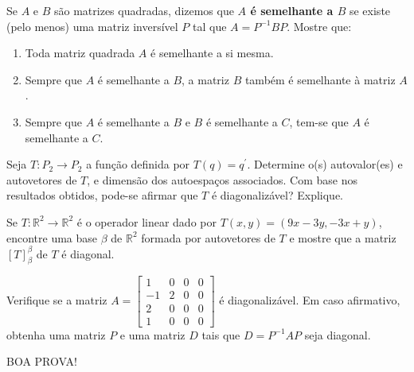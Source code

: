 \documentclass[12pt,a4paper]{article}
\newcommand{\fixme}{{\color{red}(...)}}
\newcommand*\R{\mathbb{R}}
\begin{document}
\begin{ExerciseList}
\Exercise[title={2,5}]
Se $A$ e $B$ são matrizes quadradas, dizemos que \textbf{$A$ é semelhante a $B$} se existe (pelo menos) uma matriz inversível $P$ tal que $A = P^{-1} B P$. Mostre que:
\begin{enumerate}
\item Toda matriz quadrada $A$ é semelhante a si mesma.
\item Sempre que $A$ é semelhante a $B$, a matriz $B$ também é semelhante à matriz $A$.
\item Sempre que $A$ é semelhante a $B$ e $B$ é semelhante a $C$, tem-se que $A$ é semelhante a $C$.
\end{enumerate}
\Answer \fixme

\Exercise[title={2,5}]
Seja $T: P_2 \to P_2$ a função definida por $T(q) = q^\prime$. Determine o(s) autovalor(es) e autovetores de $T$, e dimensão dos autoespaços associados. Com base nos resultados obtidos, pode-se afirmar que $T$ é diagonalizável? Explique.
\Answer \fixme

\Exercise[title={2,5}] Se $T : \R^2 \to \R^2$ é o operador linear dado por $T (x, y) = (9x - 3y, -3x + y)$, encontre uma base $\beta$ de $\R^2$ formada por autovetores de $T$ e mostre que a matriz $[T]_\beta^\beta$ de $T$ é diagonal.
\Answer \fixme

\Exercise[title={2,5}] Verifique se a matriz $A =
\begin{bmatrix}
1& 0& 0& 0\\
-1& 2& 0& 0\\
2& 0& 0& 0\\
1& 0& 0& 0
\end{bmatrix}$ é diagonalizável. Em caso afirmativo, obtenha uma matriz $P$ e uma matriz $D$ tais que $D = P^{-1} A P$ seja diagonal.
\Answer \fixme
\end{ExerciseList}

\begin{center}
BOA PROVA!
\end{center}

\end{document}
